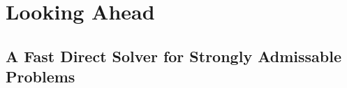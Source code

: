 \chapter{Looking Ahead}\label{chpt:3}


\section{A Fast Direct Solver for Strongly Admissable Problems}\label{sec:3_1}


% 

% 
